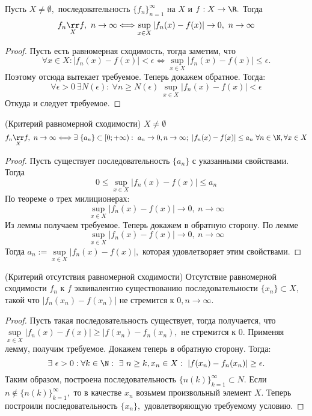 \begin{lemma}
    Пусть $X \neq \emptyset,$ последовательность $\{f_n\}_{n = 1}^\infty$ на $X$ и $f: X \rightarrow \R.$ Тогда
    $$f_n \underset{X}{\rr} f, \ n\rightarrow \infty \Longleftrightarrow \sup\limits_{x \in X} |f_n(x) - f(x)| \rightarrow 0, \ n \rightarrow \infty$$
\end{lemma}

\begin{proof}
    Пусть есть равномерная сходимость, тогда заметим, что
    $$\forall x \in X: |f_n(x) - f(x)| < \epsilon \Longleftrightarrow \sup\limits_{x \in X} |f_n(x) - f(x)| \leq \epsilon.$$
    Поэтому отсюда вытекает требуемое. Теперь докажем обратное. Тогда:
    $$\forall \epsilon > 0 \ \exists N(\epsilon): \ \forall n \geq N(\epsilon) \ \sup\limits_{x \in X} |f_n(x) - f(x)| < \epsilon $$
    Откуда и следует требуемое.
\end{proof}

\begin{theorem}
    (Критерий равномерной сходимости) $X \neq \emptyset$
    $$f_n \underset{X}{\rr} f, \ n\rightarrow \infty \Longleftrightarrow \exists \ \{a_n\} \subset [0; +\infty): \ a_n \rightarrow 0, n \rightarrow \infty; \ |f_n(x) - f(x)| \leq a_n \ \forall n \in \N, \forall x \in X$$
\end{theorem}

\begin{proof}
    Пусть существует последовательность $\{a_n\}$ с указанными свойствами. Тогда 
    $$0 \leq \sup\limits_{x \in X} |f_n(x) - f(x)| \leq a_n$$
    По теореме о трех милиционерах:
    $$\sup\limits_{x \in X} |f_n(x) - f(x)| \rightarrow 0, \ n \rightarrow \infty$$
    Из леммы получаем требуемое.
    Теперь докажем в обратную сторону. По лемме $$\sup\limits_{x \in X} |f_n(x) - f(x)| \rightarrow 0, \ n \rightarrow \infty$$
    Тогда $a_n := \sup\limits_{x \in X} |f_n(x) - f(x)|,$ которая удовлетворяет этим свойствами.
\end{proof}

\begin{theorem}
    (Критерий отсутствия равномерной сходимости) Отсутствие равномерной сходимости $f_n$ к $f$ эквивалентно существованию последовательности $\{x_n\} \subset X,$ такой что  $|f_n(x_n) - f(x_n)|$ не стремится к $0, n \rightarrow \infty.$
\end{theorem}

\begin{proof}
    Пусть такая последовательность существует, тогда получается, что $\sup\limits_{x \in X} |f_n(x) - f(x)| \geq |f(x_n) - f_n(x_n),$ не стремится к $0.$ Применяя лемму, получим требуемое. Докажем теперь в обратную сторону. Тогда:
    $$\exists \ \epsilon > 0: \forall k \in \N: \ \exists \ n\geq k, x_n \in X: \ |f(x_n) - f_n(x_n)| \geq \epsilon.$$
    Таким образом, построена последовательность $\{n(k)\}_{k = 1}^{\infty} \subset N.$ Если $n \notin \{n(k)\}_{k = 1}^{\infty},$ то в качестве $x_n$ возьмем произвольный элемент $X.$ Теперь построили последовательность $\{x_n\},$ удовлетворяющую требуемому условию.
\end{proof}

